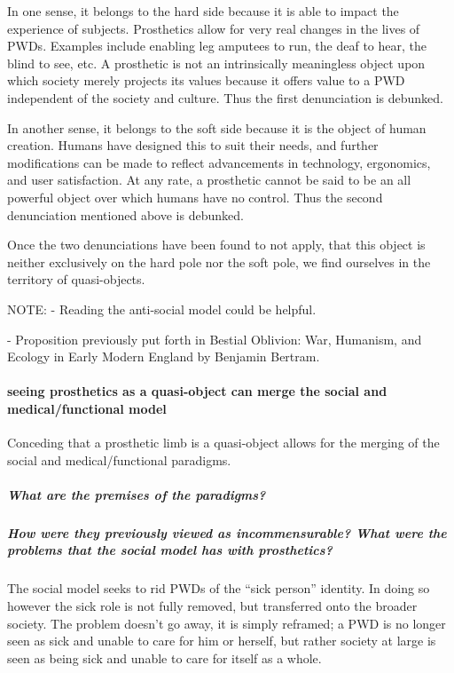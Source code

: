 \documentclass{lps}
\begin{document}
In one sense, it belongs to the hard side because it is able to impact the
experience of subjects. Prosthetics allow for very real changes in the lives
of PWDs. Examples include enabling leg amputees to run, the deaf to hear, the
blind to see, etc. A prosthetic is not an intrinsically meaningless object
upon which society merely projects its values because it offers value to a PWD
independent of the society and culture. Thus the first denunciation is
debunked.

In another sense, it belongs to the soft side because it is the object of
human creation. Humans have designed this to suit their needs, and further
modifications can be made to reflect advancements in technology, ergonomics,
and user satisfaction. At any rate, a prosthetic cannot be said to be an all
powerful object over which humans have no control. Thus the second
denunciation mentioned above is debunked.

Once the two denunciations have been found to not apply, that this object is
neither exclusively on the hard pole nor the soft pole,  we find ourselves in
the territory of quasi-objects.


NOTE:
- Reading the anti-social model could be helpful.

- Proposition previously put forth in Bestial Oblivion: War, Humanism, and
Ecology in Early Modern England by Benjamin Bertram.

\paragraph{seeing prosthetics as a quasi-object can merge the social and
medical/functional model}

Conceding that a prosthetic limb is a quasi-object allows for the merging of
the social and medical/functional paradigms. 

\subparagraph{What are the premises of the paradigms?}

\subparagraph{How were they previously viewed as incommensurable? What were
the problems that the social model has with prosthetics?}

The social model seeks to rid PWDs of the “sick person” identity. In doing so
however the sick role is not fully removed, but transferred onto the broader
society. The problem doesn’t go away, it is simply reframed; a PWD is no
longer seen as sick and unable to care for him or herself, but rather society
at large is seen as being sick and unable to care for itself as a whole.
\end{document}
